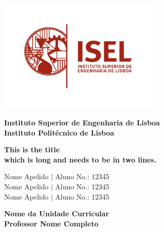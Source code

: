     \begin{titlepage}

	\thispagestyle{empty}
	
	\begin{flushleft}
		\includegraphics[width=7.7cm]{./pic/logo_ISEL_principal_PNG.png}
	\end{flushleft}

	\vspace{-2.5cm}
	
	\vspace{1.5cm}
	\centering \bfseries \Large Instituto Superior de Engenharia de Lisboa \\
	\centering \bfseries \large Instituto Politécnico de Lisboa
	\vspace{2.5cm}
	\normalsize 

	\centering \begin{minipage}[t]{17cm}
		\centering \bfseries \large This is the title  \\
		which is long and needs to be in two lines.
		\medskip
	\end{minipage}

	\vspace{2.3cm}

	\begin{minipage}[t]{9cm}
		\centering Nome Apelido $|$ Aluno No.: 12345 \\
		\centering Nome Apelido $|$ Aluno No.: 12345 \\
		\centering Nome Apelido $|$ Aluno No.: 12345 \\
	\end{minipage}

	\vspace{2.0cm}
	\centering \bfseries \large Nome da Unidade Curricular \\
	\vspace{0.5cm}
	\normalsize 
	\centering Professor Nome Completo
		

\end{titlepage}
